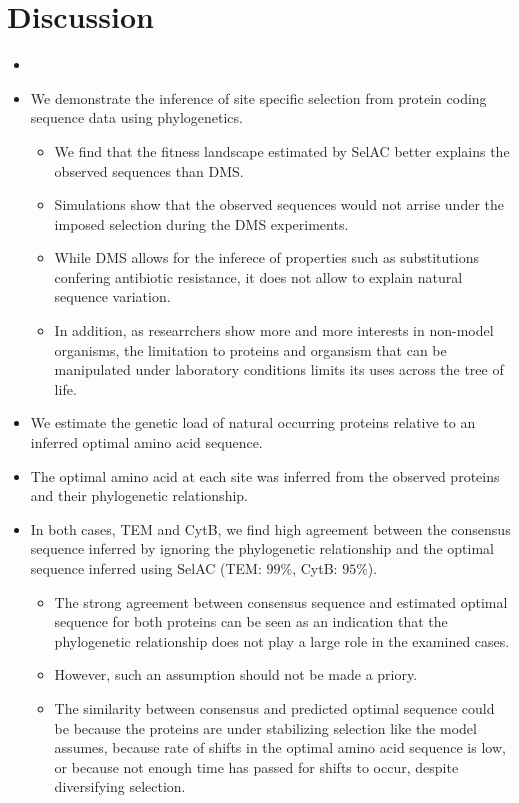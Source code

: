 \documentclass[12pt]{article}
\begin{document}
\section*{Discussion}
\begin{itemize}
	\item 



	\item We demonstrate the inference of site specific selection from protein coding sequence data using phylogenetics.
	\begin{itemize}
		\item We find that the fitness landscape estimated by SelAC better explains the observed sequences than DMS.
		\item Simulations show that the observed sequences would not arrise under the imposed selection during the DMS experiments.
		\item While DMS allows for the inferece of properties such as substitutions confering antibiotic resistance, it does not allow to explain natural sequence variation.
		\item In addition, as researrchers show more and more interests in non-model organisms, the limitation to proteins and organsism that can be manipulated under laboratory conditions limits its uses across the tree of life.
	\end{itemize}
	\item We estimate the genetic load of natural occurring proteins relative to an inferred optimal amino acid sequence.
	\item The optimal amino acid at each site was inferred from the observed proteins and their phylogenetic relationship.
	\item In both cases, TEM and CytB, we find high agreement between the consensus sequence inferred by ignoring the phylogenetic relationship and the optimal sequence inferred using SelAC (TEM: $99 \%$, CytB: $95 \%$).
	\begin{itemize}
		\item The strong agreement between consensus sequence and estimated optimal sequence for both proteins can be seen as an indication that the phylogenetic relationship does not play a large role in the examined cases.
		\item However, such an assumption should not be made a priory.
		\item The similarity between consensus and predicted optimal sequence could be because the proteins are under stabilizing selection like the model assumes, because rate of shifts in the optimal amino acid sequence is low, or because not enough time has passed for shifts to occur, despite diversifying selection.

\end{itemize}
\end{itemize}
\end{document}
